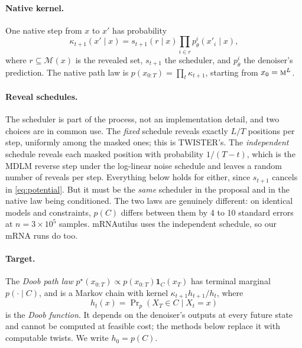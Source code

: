 \documentclass[11pt]{article}
\theoremstyle{definition}
\newcommand{\M}{\mathcal{M}}
\newcommand{\one}{\mathbf{1}}
\newcommand{\mask}{\textsc{m}}
\begin{document}
\paragraph{Native kernel.}
One native step from $x$ to $x'$ has probability
\begin{equation}\label{eq:native}
  \kappa_{t+1}(x'\mid x)=s_{t+1}(r\mid x)\prod_{i\in r}p^i_\theta(x'_i\mid x),
\end{equation}
where $r\subseteq\M(x)$ is the revealed set, $s_{t+1}$ the scheduler, and $p^i_\theta$ the denoiser's prediction.
The native path law is $p(x_{0:T})=\prod_t\kappa_{t+1}$, starting from $x_0=\mask^L$.

\paragraph{Reveal schedules.}
The scheduler is part of the process, not an implementation detail, and two choices are in common use. The
\emph{fixed} schedule reveals exactly $L/T$ positions per step, uniformly among the masked ones; this is
TWISTER's. The \emph{independent} schedule reveals each masked position with probability $1/(T-t)$, which is the
MDLM reverse step \cite{sahoo2024} under the log-linear noise schedule and leaves a random number of reveals per
step. Everything below holds for either, since $s_{t+1}$ cancels in \eqref{eq:potential}. But it must be the
\emph{same} scheduler in the proposal and in the native law being conditioned. The two laws are genuinely
different: on identical models and constraints, $p(C)$ differs between them by 4 to 10 standard errors at
$n=3\times10^5$ samples. mRNAutilus uses the independent schedule, so our mRNA runs do too.

\paragraph{Target.}
The \emph{Doob path law} $p^\star(x_{0:T})\propto p(x_{0:T})\one_C(x_T)$ has terminal marginal $p(\cdot\mid C)$,
and is a Markov chain with kernel $\kappa_{t+1}h_{t+1}/h_t$, where
\[
  h_t(x)=\Pr\nolimits_p(X_T\in C\mid X_t=x)
\]
is the \emph{Doob function}. It depends on the denoiser's outputs at every future state and cannot be computed at
feasible cost; the methods below replace it with computable twists. We write $h_0=p(C)$.
\end{document}
